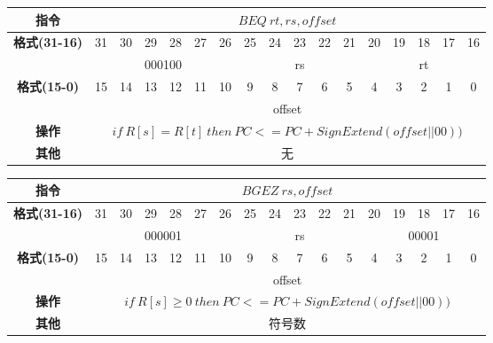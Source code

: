 \documentclass[11pt,utf8]{article}
\begin{document}
\begin{center}
\begin{tabular}{|c|c|c|c|c|c|c|c|c|c|c|c|c|c|c|c|c|}
\hline
\textbf{指令} & \multicolumn{16}{c|}{$BEQ~rt,rs,offset$} \\
\hline
\multirow{2}{*}{\textbf{格式(31-16)}} & 31 & 30 & 29 & 28 & 27 & 26 & 25 & 24 & 23 & 22 & 21 & 20 & 19 & 18 & 17 & 16 \\ 
\cline{2-17}
& \multicolumn{6}{c|}{000100} & \multicolumn{5}{c|}{rs} & \multicolumn{5}{c|}{rt}\\
\hline
\multirow{2}{*}{\textbf{格式(15-0)}} & 15 & 14 & 13 & 12 & 11 & 10 & 9 & 8 & 7 & 6 & 5 & 4 & 3 & 2 & 1 & 0 \\
\cline{2-17}
& \multicolumn{16}{c|}{offset}\\
\hline
\textbf{操作} & \multicolumn{16}{c|}{$if~R[s] = R[t]~then~PC<= PC + SignExtend(offset||00))$} \\
\hline
\textbf{其他} & \multicolumn{16}{c|}{无} \\
\hline
\end{tabular}
\end{center}

\begin{center}
\begin{tabular}{|c|c|c|c|c|c|c|c|c|c|c|c|c|c|c|c|c|}
\hline
\textbf{指令} & \multicolumn{16}{c|}{$BGEZ~rs,offset$} \\
\hline
\multirow{2}{*}{\textbf{格式(31-16)}} & 31 & 30 & 29 & 28 & 27 & 26 & 25 & 24 & 23 & 22 & 21 & 20 & 19 & 18 & 17 & 16 \\ 
\cline{2-17}
& \multicolumn{6}{c|}{000001} & \multicolumn{5}{c|}{rs} & \multicolumn{5}{c|}{00001}\\
\hline
\multirow{2}{*}{\textbf{格式(15-0)}} & 15 & 14 & 13 & 12 & 11 & 10 & 9 & 8 & 7 & 6 & 5 & 4 & 3 & 2 & 1 & 0 \\
\cline{2-17}
& \multicolumn{16}{c|}{offset}\\
\hline
\textbf{操作} & \multicolumn{16}{c|}{$if~R[s] \ge 0~then~PC<= PC + SignExtend(offset||00))$} \\
\hline
\textbf{其他} & \multicolumn{16}{c|}{符号数} \\
\hline
\end{tabular}
\end{center}
\end{document}
